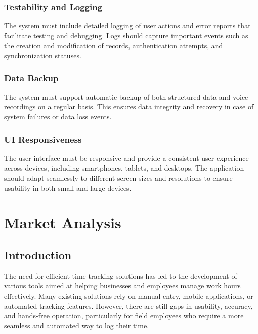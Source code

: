 \documentclass[
  digital,     %
  oneside,     %
  nosansbold,  %
  nocolorbold, %
  lof,         %
  lot,         %
]{fithesis4}
\begin{document}
\subsection{Testability and Logging}  
The system must include detailed logging of user actions and error reports that facilitate testing and debugging. Logs should capture important events such as the creation and modification of records, authentication attempts, and synchronization statuses.

\subsection{Data Backup}  
The system must support automatic backup of both structured data and voice recordings on a regular basis. This ensures data integrity and recovery in case of system failures or data loss events.

\subsection{UI Responsiveness}  
The user interface must be responsive and provide a consistent user experience across devices, including smartphones, tablets, and desktops. The application should adapt seamlessly to different screen sizes and resolutions to ensure usability in both small and large devices.

    
\shorthandoff{-}
\begin{markdown}
   
\end{markdown}
\shorthandon{-}

\chapter{Market Analysis}

\section{Introduction}
The need for efficient time-tracking solutions has led to the development of various tools aimed at helping businesses and employees manage work hours effectively. Many existing solutions rely on manual entry, mobile applications, or automated tracking features. However, there are still gaps in usability, accuracy, and hands-free operation, particularly for field employees who require a more seamless and automated way to log their time.
\end{document}
